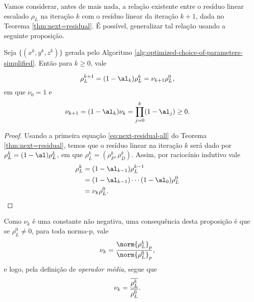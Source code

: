 


Vamos considerar, antes de mais nada, a relação existente entre o resíduo linear escalado $\rho_L$ na iteração $k$ com o resíduo 
linear da iteração $k+1$, dada no Teorema \ref{thm:next=residual}. É possível, generalizar tal relação usando a seguinte proposição. 
\begin{prop}\label{prop:nu_k}
 Seja $\{(x^k,y^k,z^k)\}$ gerada pelo Algoritmo \ref{alg:optimized-choice-of-parameters-simplified}. Então para $k\geq0$, vale  

\begin{equation}
\label{eq:residual-norm-relation}
 \rho_L^{k+1}  = (1-\al_k) \rho_L^{k} = \nu_{k+1}  \rho_L^{0},
\end{equation}
em que  $\nu_0 = 1$ e 
\begin{equation}
	\label{eq:nu_k+1}
\nu_{k+1} = (1-\al_k)\nu_k = \prod_{j=0}^{k}(1-\al_j) \geq 0.
\end{equation}
\end{prop}

\begin{proof}
	Usando a primeira equação \eqref{eq:next-residual-all} do Teorema \ref{thm:next=residual},  temos que  o resíduo linear na iteração $k$ será dado por $\rho_L^{k} = (1-\al)\rho_L^{k}$, em que $\rho_L^{k} = (\rho_P^{k},\rho_D^{k})$. Assim, por raciocínio indutivo vale
	\begin{align*}
		\rho_L^{k} & = (1-\al_{k-1})\rho_L^{k-1}\\
				   & = (1-\al_{k-1})\cdots(1-\al_{0})\rho_L^{0}\notag\\
				   & = \nu_k \rho_L^{0}. \qedhere
	\end{align*}
\end{proof}

Como  $\nu_k$ é uma constante não negativa,  uma consequência desta proposição é que se $\rho_L^0\neq 0 $, para toda norma-p, vale 
\[
\nu_k = \frac{\norm{\rho_L^{k}}_p}{\norm{\rho_L^{0}}_p},
\]
e logo, pela definição de \emph{operador média}, segue que
\begin{equation}
	\label{eq:nu_k}
	\nu_k = \frac{\overline{\rho_L^k}}{\overline{\rho_L^0}}.
\end{equation}

